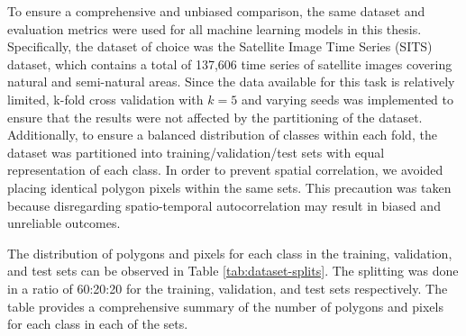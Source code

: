 To ensure a comprehensive and unbiased comparison, the same dataset and evaluation metrics were used for all machine learning models in this thesis. 
Specifically, the dataset of choice was the Satellite Image Time Series (SITS) dataset, which contains a total of 137,606 time series of satellite images covering natural and semi-natural areas. 
Since the data available for this task is relatively limited, k-fold cross validation with $k=5$ and varying seeds was implemented to ensure that the results were not affected by the partitioning of the dataset.
Additionally, to ensure a balanced distribution of classes within each fold, the dataset was partitioned into training/validation/test sets with equal representation of each class. 
In order to prevent spatial correlation, we avoided placing identical polygon pixels within the same sets. 
This precaution was taken because disregarding spatio-temporal autocorrelation \cite{doi:10.1080/10095020.2019.1643609} may result in biased and unreliable outcomes.

The distribution of polygons and pixels for each class in the training, validation, and test sets can be observed in Table \ref{tab:dataset-splits}.
The splitting was done in a ratio of 60:20:20 for the training, validation, and test sets respectively.
The table provides a comprehensive summary of the number of polygons and pixels for each class in each of the sets.

